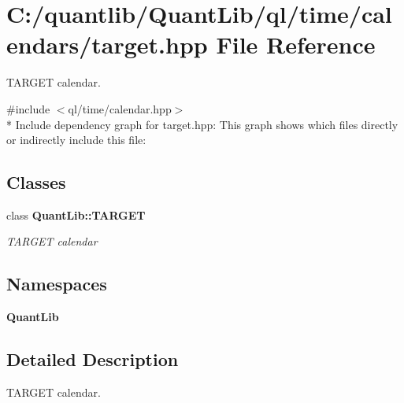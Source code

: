 \section{C\+:/quantlib/\+Quant\+Lib/ql/time/calendars/target.hpp File Reference}
\label{target_8hpp}


T\+A\+R\+G\+ET calendar.  


{\ttfamily \#include $<$ql/time/calendar.\+hpp$>$}\\*
Include dependency graph for target.\+hpp\+:
This graph shows which files directly or indirectly include this file\+:
\subsection*{Classes}
\begin{DoxyCompactItemize}
\item 
class {\bf Quant\+Lib\+::\+T\+A\+R\+G\+ET}
\begin{DoxyCompactList}\small\item\em T\+A\+R\+G\+ET calendar \end{DoxyCompactList}\end{DoxyCompactItemize}
\subsection*{Namespaces}
\begin{DoxyCompactItemize}
\item 
 {\bf Quant\+Lib}
\end{DoxyCompactItemize}


\subsection{Detailed Description}
T\+A\+R\+G\+ET calendar. 

